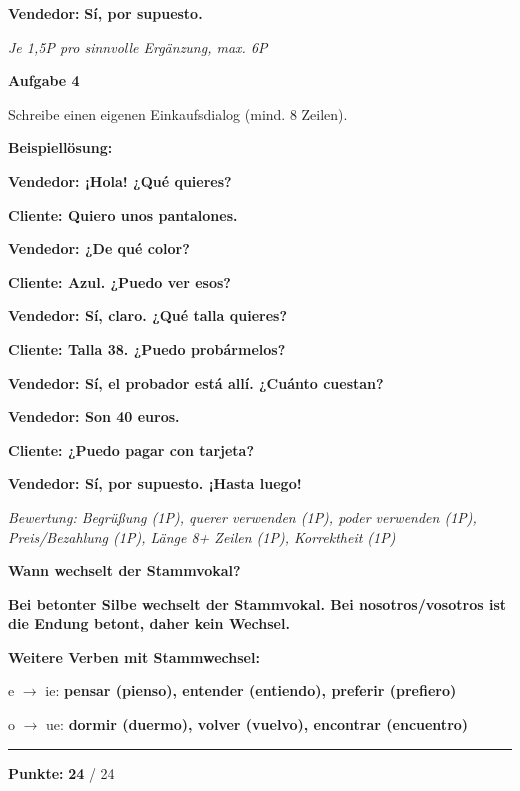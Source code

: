 \documentclass[11pt, a4paper]{article}
\newcommand{\fachfarbe}{spanisch}
\newcommand{\maxpunkte}{24}
\newcommand{\punktebox}[1]{\hfill\fbox{\small \_/#1}}
\newcommand{\lsg}[1]{\textcolor{loesung}{\textbf{#1}}}
\newcommand{\es}[1]{\textcolor{\fachfarbe}{\textbf{#1}}}
\newenvironment{aufgabe}[1]{%
    \vspace{10pt}
    \noindent\textbf{\textcolor{\fachfarbe}{Aufgabe #1}}
    \vspace{5pt}
    \begin{list}{}{\leftmargin=0pt}
    \item[]
}{%
    \end{list}
}
\begin{document}
\noindent
\textbf{Vendedor:} \es{Sí, por supuesto.}

\vspace{0.5em}
\textit{\textcolor{grau}{Je 1,5P pro sinnvolle Ergänzung, max. 6P}}

\vspace{15pt}


\begin{aufgabe}{4}
Schreibe einen eigenen Einkaufsdialog (mind. 8 Zeilen). \punktebox{6}
\end{aufgabe}

\textbf{Beispiellösung:}

\lsg{Vendedor: ¡Hola! ¿Qué quieres?}

\lsg{Cliente: Quiero unos pantalones.}

\lsg{Vendedor: ¿De qué color?}

\lsg{Cliente: Azul. ¿Puedo ver esos?}

\lsg{Vendedor: Sí, claro. ¿Qué talla quieres?}

\lsg{Cliente: Talla 38. ¿Puedo probármelos?}

\lsg{Vendedor: Sí, el probador está allí. ¿Cuánto cuestan?}

\lsg{Vendedor: Son 40 euros.}

\lsg{Cliente: ¿Puedo pagar con tarjeta?}

\lsg{Vendedor: Sí, por supuesto. ¡Hasta luego!}

\vspace{0.5em}
\textit{\textcolor{grau}{Bewertung: Begrüßung (1P), querer verwenden (1P), poder verwenden (1P), Preis/Bezahlung (1P), Länge 8+ Zeilen (1P), Korrektheit (1P)}}

\vspace{10pt}


\begin{merkkasten}
\textbf{Wann wechselt der Stammvokal?}

\lsg{Bei betonter Silbe wechselt der Stammvokal. Bei nosotros/vosotros ist die Endung betont, daher kein Wechsel.}

\vspace{0.5em}
\textbf{Weitere Verben mit Stammwechsel:}

e $\rightarrow$ ie: \lsg{pensar (pienso), entender (entiendo), preferir (prefiero)}

o $\rightarrow$ ue: \lsg{dormir (duermo), volver (vuelvo), encontrar (encuentro)}
\end{merkkasten}

\vspace{20pt}
\hrule
\vspace{10pt}

\begin{flushright}
\textbf{Punkte:} \lsg{\maxpunkte} / \maxpunkte
\end{flushright}
\end{document}

